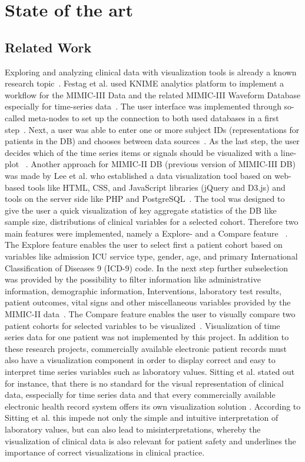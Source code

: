 \documentclass[aac,crcready]{iosart2x}
\begin{document}
\section{State of the art}\label{s2}
%
\subsection{Related Work}
Exploring and analyzing clinical data with visualization tools is already a known research topic~\cite{Caban.2015, Sittig.2015, UnberathPhilipp.2019, Festag.2019}. Festag et al. used KNIME analytics platform to implement a workflow for the MIMIC-III Data and the related MIMIC-III Waveform Database especially for time-series data~\cite{Festag.2019}. The user interface was implemented through so-called meta-nodes to set up the connection to both used databases in a first step~\cite{Festag.2019}. Next, a user was able to enter one or more subject IDs (representations for patients in the DB) and chooses between data sources~\cite{Festag.2019}. As the last step, the user decides which of the time series items or signals should be visualized with a line-plot ~\cite{Festag.2019}.
Another approach for MIMIC-II DB (previous version of MIMIC-III DB) was made by Lee et al. who established a data visualization tool based on web-based tools like HTML, CSS, and JavaScript libraries (jQuery and D3.js) and tools on the server side like PHP and PostgreSQL~\cite{Lee.2016}. The tool was designed to give the user a quick visualization of key aggregate statistics of the DB like sample size, distributions of clinical variables for a selected cohort. Therefore two main features were implemented, namely a Explore- and a Compare feature ~\cite{Lee.2016}. The Explore feature enables the user to select first a patient cohort based on variables like admission ICU service type, gender, age, and primary International Classification of Diseases 9 (ICD-9) code. In the next step further subselection was provided by the possibility to filter information like administrative information, demographic information, Interventions, laboratory test results, patient outcomes, vital signs and other miscellaneous variables provided by the MIMIC-II data~\cite{Lee.2016}. The Compare feature enables the user to visually compare two patient cohorts for
selected variables to be visualized~\cite{Lee.2016}. Visualization of time series data for one patient was not implemented by this project. In addition to these research projects, commercially available electronic patient records must also have a visualization component in order to display correct and easy to interpret time series variables such as laboratory values. Sitting et al. stated out for instance, that there is no standard for the visual representation of clinical data, esspecially for time series data and that every commercially available electronic health record system offers its own visualization solution \cite{Sittig.2015}. According to Sitting et al. this impede not only the simple and intuitive interpretation of laboratory values, but can also lead to misinterpretations, whereby the visualization of clinical data is also relevant for patient safety and underlines the importance of correct visualizations in clinical practice.
\end{document}
